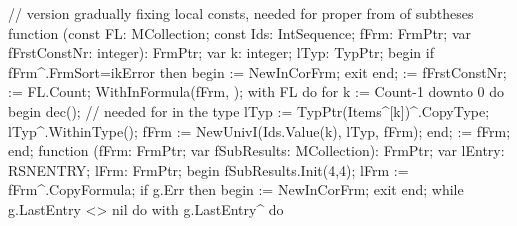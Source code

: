 // version gradually fixing local consts, needed for proper from of subtheses
function (const FL: MCollection;
                      const Ids: IntSequence;
                      fFrm: FrmPtr;
                      var fFrstConstNr: integer): FrmPtr;
var
   k: integer;
   lTyp: TypPtr;
begin
   if fFrm^.FrmSort=ikError then begin  := NewInCorFrm; exit end;
    := fFrstConstNr;
    := FL.Count;
   WithInFormula(fFrm, );
   with FL do
      for k := Count-1 downto 0 do
      begin
         dec(); // needed for  in the type
         lTyp := TypPtr(Items^[k])^.CopyType;
         lTyp^.WithinType();
         fFrm := NewUnivI(Ids.Value(k), lTyp, fFrm);
      end;
    := fFrm;
end;
\eatline
{}\nwendcode{}\nwdocspar
\nwenddocs{}\endmoddef\nwstartdeflinemarkup{}\nwenddeflinemarkup
function (fFrm: FrmPtr; var fSubResults: MCollection): FrmPtr;
var
   lEntry: RSNENTRY;
   lFrm: FrmPtr;
begin
   fSubResults.Init(4,4);
   lFrm := fFrm^.CopyFormula;
   if g.Err then begin  := NewInCorFrm; exit end;
   while g.LastEntry <> nil do
      with g.LastEntry^ do
